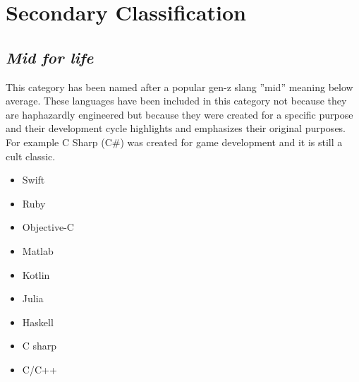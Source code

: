 \documentclass[conference]{IEEEtran}
\begin{document}
\section{Secondary Classification}

\subsection{\textit{Mid for life}}
This category has been named after a popular gen-z slang ''mid'' meaning below average.
These languages have been included in this category not because they are haphazardly engineered but because they were created for a specific purpose and their development cycle highlights and emphasizes their original purposes. For example C Sharp (C#) was created for game development and it is still a cult classic.

\begin{itemize}
\item{Swift}
\item{Ruby}
\item{Objective-C}
\item{Matlab}
\item{Kotlin}
\item{Julia}
\item{Haskell}
\item{C sharp}
\item{C/C++}
\end{itemize}
\end{document}
